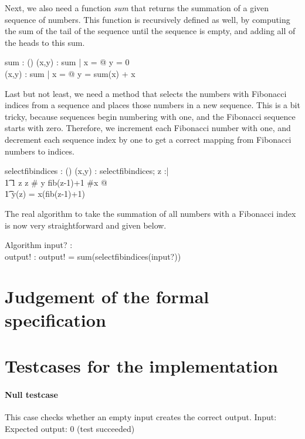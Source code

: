 \documentclass[12pt]{article}
\begin{document}
Next, we also need a function \textit{sum} that returns the summation of a given sequence of numbers. This function is recursively defined as well, by computing the sum of the tail of the sequence until the sequence is empty, and adding all of the heads to this sum.
\begin{axdef}
sum : \power (\seq \real \fun \real)
\where
\forall (x,y) : sum | x = \langle\rangle @ y = 0 \\
\forall (x,y) : sum | x \not = \langle\rangle @ y = sum(\tail x) + \head x
\end{axdef}

Last but not least, we need a method that selects the numbers with Fibonacci indices from a sequence and places those numbers in a new sequence. This is a bit tricky, because sequences begin numbering with one, and the Fibonacci sequence starts with zero. Therefore, we increment each Fibonacci number with one, and decrement each sequence index by one to get a correct mapping from Fibonacci numbers to indices.
\begin{axdef}
selectfibindices : \power (\seq \real \fun \seq \real)
\where
\forall (x,y) : selectfibindices; z :\nat | \\
\t1 1 \leq z \wedge z \leq \# y \wedge fib(z-1)+1 \leq \#x @ \\
\t1 y(z) = x(fib(z-1)+1)
\end{axdef}

The real algorithm to take the summation of all numbers with a Fibonacci index is now very straightforward and given below.
\begin{schema}{Algorithm}
input? : \seq \real \\
output! : \real
\where
output! = sum(selectfibindices(input?))
\end{schema}

\section{Judgement of the formal specification}

\section{Testcases for the implementation}

\paragraph{Null testcase}
This case checks whether an empty input creates the correct output.
Input: {}
Expected output: 0 (test succeeded)
\end{document}
